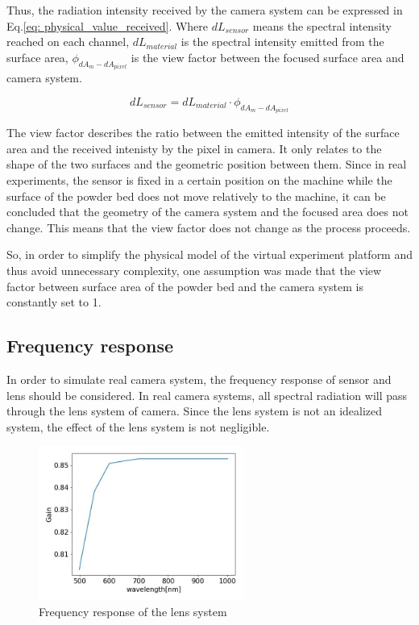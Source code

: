 Thus, the radiation intensity received by the camera system can be expressed in Eq.\ref{eq: physical_value_received}.
Where $dL_{sensor}$ means the spectral intensity reached on each channel, $dL_{material}$
is the spectral intensity emitted from the surface area, $\phi_{dA_m - dA_{pixel}}$ is the 
view factor between the focused surface area and camera system.

\begin{equation}
    \label{eq: physical_value_received}
    dL_{sensor} =  dL_{material} \cdot \phi_{dA_m - dA_{pixel}}
\end{equation}


The view factor describes the ratio between the emitted intensity of the surface area 
and the received intenisty by the pixel in camera. It only relates to the shape of 
the two surfaces and the geometric position between them\cite{Rohsenow.1998}. Since 
in real experiments, the sensor is fixed in a certain position on the machine while the 
surface of the powder bed does not move relatively to the machine, it can be concluded
that the geometry of the camera system and the focused area does not change. This means that 
the view factor does not change as the process proceeds.


So, in order to simplify the physical model of the virtual experiment platform and 
thus avoid unnecessary complexity, one assumption was made that the view factor between 
surface area of the powder bed and the camera system is constantly set to 1.


\subsection{Frequency response}
In order to simulate real camera system, the frequency response of sensor and lens 
should be considered. In real camera systems, all spectral radiation will 
pass through the lens system of camera. Since the lens system is not an 
idealized system, the effect of the lens system is not negligible. 

\begin{figure}[htbp]
    \centering
    \includegraphics[width=0.6\textwidth]{figures/tr_frequency_response.jpg}
    \caption{Frequency response of the lens system}
    \label{fig: frequency_response_lens}
\end{figure}


